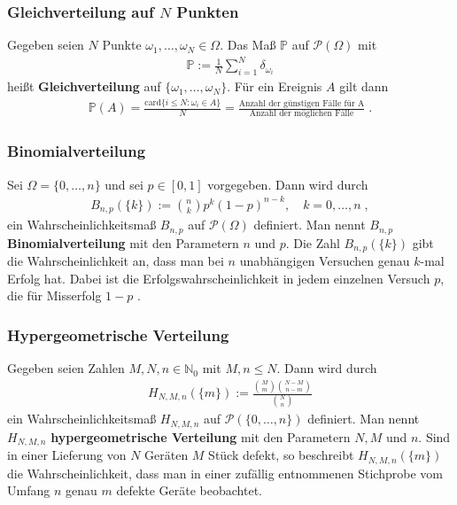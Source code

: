 \documentclass[ngerman,draft,parskip=half,twoside]{scrartcl}
\newcommand*{\N}{\mathbb{N}}      %
\newcommand*{\PotM}{\mathcal{P}}    %
\newcommand*{\WKM}{\mathbb{P}}      %
\begin{document}
\subsubsection{Gleichverteilung auf $N$ Punkten}
Gegeben seien $N$ Punkte $\omega_1,\ldots,\omega_N\in\Omega$.
Das Maß $\WKM$ auf $\PotM(\Omega)$ mit
\begin{gather*}
  \WKM:=\frac{1}{N}\sum_{i=1}^N \delta_{\omega_i}
\end{gather*}
heißt \textbf{Gleichverteilung} auf $\{\omega_1,\ldots,\omega_N\}$. Für ein Ereignis $A$ gilt dann
\begin{gather*}
  \WKM(A)=\frac{\mathrm{card}\{ i\le N \colon \omega_i\in A\}}{N}=
     \frac{\mbox{Anzahl der günstigen Fälle für A}}{\mbox{Anzahl der möglichen Fälle}}\;.
\end{gather*}
\subsubsection{Binomialverteilung}
Sei $\Omega=\{0,\ldots,n\}$ und sei $p\in[0,1]$ vorgegeben. Dann wird durch
\begin{gather*}
  B_{n,p}(\{k\}):={n\choose k} p^k(1-p)^{n-k},\quad k=0,\ldots,n\;,
\end{gather*}
ein Wahrscheinlichkeitsmaß $B_{n,p}$ auf $\PotM(\Omega)$ definiert. Man nennt $B_{n,p}$
\textbf{Binomialverteilung} mit den Parametern $n$ und $p$. Die Zahl
$B_{n,p}(\{k\})$ gibt die Wahrscheinlichkeit an, dass man bei $n$ unabhängigen Versuchen genau $k$-mal
Erfolg hat. Dabei ist die Erfolgswahrscheinlichkeit in jedem einzelnen Versuch $p$, die für
Misserfolg $1-p$ .
\subsubsection{Hypergeometrische Verteilung}
Gegeben seien Zahlen $M,N,n\in\N_0$ mit $M,n\le N$. Dann wird durch
\begin{gather*}
  H_{N, M ,n}(\{m\}) :=\frac{{M\choose m}{N-M\choose n-m}}{{N\choose n}}
\end{gather*}
ein Wahrscheinlichkeitsmaß $H_{N,M,n}$ auf $\PotM(\{0,\ldots,n\})$
definiert. Man nennt $H_{N,M,n}$  \textbf{hypergeometrische Verteilung} mit den Parametern $N,M$ und $n$.
Sind in einer Lieferung von $N$ Geräten $M$ Stück defekt, so beschreibt $H_{N,M,n}(\{m\})$
die Wahrscheinlichkeit, dass man in einer zufällig entnommenen Stichprobe vom Umfang $n$ genau
$m$ defekte Geräte beobachtet.
\end{document}

